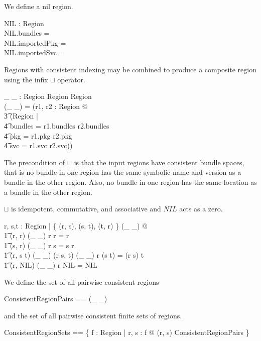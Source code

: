 \documentclass[a4paper,9pt]{article}
\begin{document}
We define a nil region.
\begin{axdef}
  NIL : Region \\
\where
 NIL.bundles = \emptyset \\
 NIL.importedPkg = \emptyset \\
 NIL.importedSvc = \emptyset \\
 \end{axdef}

Regions with consistent indexing may be combined to produce a composite region using the infix $\sqcup$ operator.
\begin{axdef}
 \_ \sqcup \_ : Region \cross Region \pfun Region \\
\where
 (\_ \sqcup \_) = (\lambda r1, r2 : Region @ \\
\t3 (\mu Region | \\
\t4 bundles = r1.bundles \cup r2.bundles \land \\
\t4 pkg = r1.pkg \cup r2.pkg \land \\
\t4 svc = r1.svc \cup r2.svc)) \\
\end{axdef}
The precondition of $\sqcup$ is that the input regions have consistent bundle spaces, that is no bundle in one
region has the same symbolic name and version as a bundle in the other region.
Also, no bundle in one region has the same location as a bundle in the other region.

$\sqcup$ is idempotent, commutative, and associative and $NIL$ acts as a zero.
\begin{argue}
  \shows \forall r, s,t : Region | \{ (r, s), (s, t), (t, r) \} \subseteq \dom(\_ \sqcup \_) @ \\
\t1 (r, r) \in \dom(\_ \sqcup \_) \land r \sqcup r = r \land \\
\t1 (s, r) \in \dom(\_ \sqcup \_) \land r \sqcup s = s \sqcup r \land \\
\t1 (r, s \sqcup t) \in \dom(\_ \sqcup \_) \land (r \sqcup s, t) \in \dom(\_ \sqcup \_) \land r \sqcup (s \sqcup t) = (r \sqcup s) \sqcup t \land \\
\t1 (r, NIL) \in \dom(\_ \sqcup \_) \land r \sqcup NIL = NIL \\
\end{argue}

We define the set of all pairwise consistent regions
\begin{zed}
  ConsistentRegionPairs == \dom(\_ \sqcup \_) \\
\end{zed}
and the set of all pairwise consistent finite sets of regions.
\begin{zed}
  ConsistentRegionSets == \{ f : \finset Region | \forall r, s : f @ (r, s) \in ConsistentRegionPairs \} \\
\end{zed}
\end{document}
